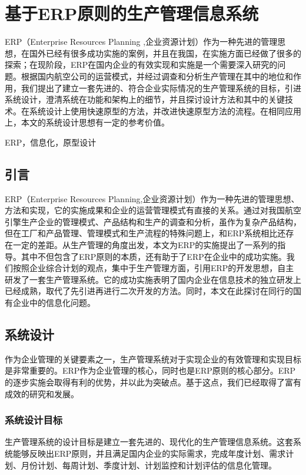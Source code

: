 \chapter{基于ERP原则的生产管理信息系统}

\ECUSTabstract ERP（Enterprise Resources Planning ,企业资源计划）作为一种先进的管理思想，在国外已经有很多成功实施的案例，并且在我国，在实施方面已经做了很多的探索；在现阶段，ERP在国内企业的有效实现和实施是一个需要深入研究的问题。根据国内航空公司的运营模式，并经过调查和分析生产管理在其中的地位和作用，我们提出了建立一套先进的、符合企业实际情况的生产管理系统的目标，引进系统设计，澄清系统在功能和架构上的细节，并且探讨设计方法和其中的关键技术。在系统设计上使用快速原型的方法，并改进快速原型方法的流程。在相同应用上，本文的系统设计思想有一定的参考价值。

\ECUSTkeywords ERP，信息化，原型设计

\section{引言}

ERP（Enterprise Resources Planning,企业资源计划）作为一种先进的管理思想、方法和实现，它的实施成果和企业的运营管理模式有直接的关系。通过对我国航空引擎生产企业的管理模式、产品结构和生产的调查和分析，虽作为复杂产品结构，但在工厂和产品管理、管理模式和生产流程的特殊问题上，和ERP系统相比还存在一定的差距。从生产管理的角度出发，本文为ERP的实施提出了一系列的指导。其中不但包含了ERP原则的本质，还有助于了ERP在企业中的成功实施。我们按照企业综合计划的观点，集中于生产管理方面，引用ERP的开发思想，自主研发了一套生产管理系统。它的成功实施表明了国内企业在信息技术的独立研发上已经成熟，取代了先引进再进行二次开发的方法。同时，本文在此探讨在同行的国有企业中的信息化问题。

\section{系统设计}

作为企业管理的关键要素之一，生产管理系统对于实现企业的有效管理和实现目标是非常重要的。ERP作为企业管理的核心，同时也是ERP原则的核心部分。ERP的逐步实施会取得有利的优势，并以此为突破点。基于这点，我们已经取得了富有成效的研究和发展。

\subsection{系统设计目标}

生产管理系统的设计目标是建立一套先进的、现代化的生产管理信息系统。这套系统能够反映出ERP原则，并且满足国内企业的实际需求，完成年度计划、需求计划、月份计划、每周计划、季度计划、计划监控和计划评估的信息化管理。

